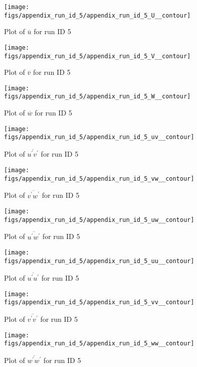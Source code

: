 \begin{figure}[H]
\centering
\texttt{[image: figs/appendix\_run\_id\_5/appendix\_run\_id\_5\_U\_\_contour]}
\caption{Plot of $\overline{u}$ for run ID 5}
\label{fig:appendix_run_id_5_U__contour}
\end{figure}


\begin{figure}[H]
\centering
\texttt{[image: figs/appendix\_run\_id\_5/appendix\_run\_id\_5\_V\_\_contour]}
\caption{Plot of $\overline{v}$ for run ID 5}
\label{fig:appendix_run_id_5_V__contour}
\end{figure}


\begin{figure}[H]
\centering
\texttt{[image: figs/appendix\_run\_id\_5/appendix\_run\_id\_5\_W\_\_contour]}
\caption{Plot of $\overline{w}$ for run ID 5}
\label{fig:appendix_run_id_5_W__contour}
\end{figure}


\begin{figure}[H]
\centering
\texttt{[image: figs/appendix\_run\_id\_5/appendix\_run\_id\_5\_uv\_\_contour]}
\caption{Plot of $\overline{u^\prime v^\prime}$ for run ID 5}
\label{fig:appendix_run_id_5_uv__contour}
\end{figure}


\begin{figure}[H]
\centering
\texttt{[image: figs/appendix\_run\_id\_5/appendix\_run\_id\_5\_vw\_\_contour]}
\caption{Plot of $\overline{v^\prime w^\prime}$ for run ID 5}
\label{fig:appendix_run_id_5_vw__contour}
\end{figure}


\begin{figure}[H]
\centering
\texttt{[image: figs/appendix\_run\_id\_5/appendix\_run\_id\_5\_uw\_\_contour]}
\caption{Plot of $\overline{u^\prime w^\prime}$ for run ID 5}
\label{fig:appendix_run_id_5_uw__contour}
\end{figure}


\begin{figure}[H]
\centering
\texttt{[image: figs/appendix\_run\_id\_5/appendix\_run\_id\_5\_uu\_\_contour]}
\caption{Plot of $\overline{u^\prime u^\prime}$ for run ID 5}
\label{fig:appendix_run_id_5_uu__contour}
\end{figure}


\begin{figure}[H]
\centering
\texttt{[image: figs/appendix\_run\_id\_5/appendix\_run\_id\_5\_vv\_\_contour]}
\caption{Plot of $\overline{v^\prime v^\prime}$ for run ID 5}
\label{fig:appendix_run_id_5_vv__contour}
\end{figure}


\begin{figure}[H]
\centering
\texttt{[image: figs/appendix\_run\_id\_5/appendix\_run\_id\_5\_ww\_\_contour]}
\caption{Plot of $\overline{w^\prime w^\prime}$ for run ID 5}
\label{fig:appendix_run_id_5_ww__contour}
\end{figure}


